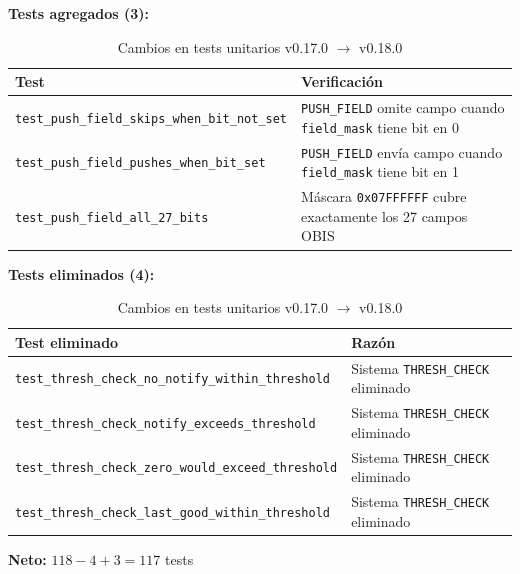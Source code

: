 \begin{table}[htbp]
\centering
\caption{Cambios en tests unitarios v0.17.0 $\rightarrow$ v0.18.0}
\label{tab:new_tests_v018}

\textbf{Tests agregados (3):}
\begin{tabular}{@{}p{7cm}p{7cm}@{}}
\toprule
\textbf{Test} & \textbf{Verificación} \\
\midrule
\texttt{test\_push\_field\_skips\_when\_bit\_not\_set} & \texttt{PUSH\_FIELD} omite campo cuando \texttt{field\_mask} tiene bit en 0 \\
\texttt{test\_push\_field\_pushes\_when\_bit\_set} & \texttt{PUSH\_FIELD} envía campo cuando \texttt{field\_mask} tiene bit en 1 \\
\texttt{test\_push\_field\_all\_27\_bits} & Máscara \texttt{0x07FFFFFF} cubre exactamente los 27 campos OBIS \\
\bottomrule
\end{tabular}

\vspace{1em}
\textbf{Tests eliminados (4):}
\begin{tabular}{@{}p{7cm}p{7cm}@{}}
\toprule
\textbf{Test eliminado} & \textbf{Razón} \\
\midrule
\texttt{test\_thresh\_check\_no\_notify\_within\_threshold} & Sistema \texttt{THRESH\_CHECK} eliminado \\
\texttt{test\_thresh\_check\_notify\_exceeds\_threshold} & Sistema \texttt{THRESH\_CHECK} eliminado \\
\texttt{test\_thresh\_check\_zero\_would\_exceed\_threshold} & Sistema \texttt{THRESH\_CHECK} eliminado \\
\texttt{test\_thresh\_check\_last\_good\_within\_threshold} & Sistema \texttt{THRESH\_CHECK} eliminado \\
\bottomrule
\end{tabular}

\vspace{0.5em}
\noindent\textbf{Neto:} $118 - 4 + 3 = 117$ tests
\end{table}
